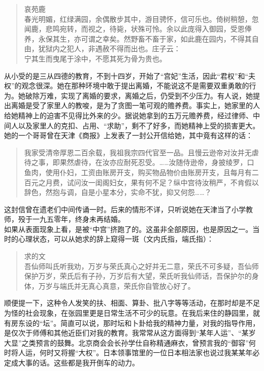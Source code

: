 \begin{quote}
	哀苑鹿\\

春光明媚，红绿满园，余偶散步其中，游目骋怀，信可乐也。倚树稍憩，忽闻鹿，悲鸣宛转，而视之，待毙，状殊可怜。余以此庞得入御园，受恩俸养，永保其生，亦可谓之幸矣。然野畜不畜于家，如此鹿在园内，不得其自由，犹狱内之犯人，非遇赦不得而出也。庄子云：\\

宁其生而曳尾于涂中，不愿其死为骨为贵也。\\
\end{quote}

从小受的是三从四德的教育，不到十四岁，开始了“宫妃”生活，因此“君权”和“夫权”的观念很深。她在那种环境中敢于提出离婚，不能说这不是需要双重勇敢的行为。她破除万难，实现了离婚的要求，离婚之后，仍受到不少压力。有人说，她提出离婚是受了家里人的教唆，是为了贪图一笔可观的赡养费。事实上，她家里的人给她精神上的迫害不见得比外来的少。据说她拿到的五万元赡养费，经过律师、中间人以及家里人的克扣、占用、“求助”，剩不了好多，而她精神上受的损害更大。她的一个哥哥曾在天津《商报》上发表了一封公开信给她，其中竟有这样的话：\\

\begin{quote}
	我家受清帝厚恩二百余载，我祖我宗四代官至一品。且慢云逊帝对汝并无虐待之事，即果然虐待，在汝亦应耐死忍受。……汝随侍逊帝，身披绫罗，口鱼肉，使用仆妇，工资由账房开支，购买物品物价由账房开支，且每月有二百元之月费，试问汝一闺阁妇女，果有何不足？纵中宫待汝稍严，不肯假以辞色，然抱与调，自是小星本分，实命不犹，抑又何怨……？\\
\end{quote}

这封信曾在遗老们中间传诵一时。后来的情形不详，只听说她在天津当了小学教师，殁于一九五零年，终身未再结婚。\\

如果从表面现象上看，是被“中宫”挤跑了的。这虽非全部原因，也是原因之一。当时的心理状态，可以从她求的辞上窥得一斑（文内氏指，端氏指）：\\

\begin{quote}
	求的文\\

吾仙师叫氏听我劝，万岁与荣氏真心之好并无二意，荣氏不可多疑，吾仙师保护万岁，荣氏后有子孙，万岁后有大望，荣氏听我仙师话，吾保护尔的身体，万岁与端氏并无真心真意，荣氏你自管放心好了。\\
\end{quote}

顺便提一下，这种令人发笑的扶、相面、算卦、批八字等等活动，在那时却是不足为怪的社会现象，在张园里更是日常生活不可少的玩意。在我后来住的静园里，就有房东设的“坛”。简直可以说，那时坛和卜卦给我的精神力量，对我的指导作用，是仅次于师傅和其他近臣们对我的教育。我常常从这方面得到“某年人运”、“某岁大显”之类预言的鼓舞。北京商会会长孙学仕自称精通麻衣，曾预言我的“御容”何时将人运，何时又将握“大权”。日本领事馆里的一位日本相法家也说过我某某年必定成大事的话。这些都是我开倒车的动力。

